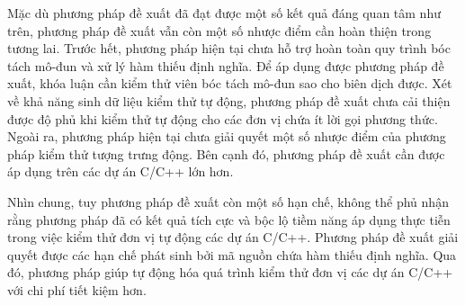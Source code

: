 Mặc dù phương pháp đề xuất đã đạt được một số kết quả đáng quan tâm như trên, phương pháp đề xuất vẫn còn một số nhược điểm cần hoàn thiện trong tương lai. Trước hết, phương pháp hiện tại chưa hỗ trợ hoàn toàn quy trình bóc tách mô-đun và xử lý hàm thiếu định nghĩa. Để áp dụng được phương pháp đề xuất, khóa luận cần kiểm thử viên bóc tách mô-đun sao cho biên dịch được. Xét về khả năng sinh dữ liệu kiểm thử tự động, phương pháp đề xuất chưa cải thiện được độ phủ khi kiểm thử tự động cho các đơn vị chứa ít lời gọi phương thức. Ngoài ra, phương pháp hiện tại chưa giải quyết một số nhược điểm của phương pháp kiểm thử tượng trưng động. Bên cạnh đó, phương pháp đề xuất cần được áp dụng trên các dự án C/C++ lớn hơn.

Nhìn chung, tuy phương pháp đề xuất còn một số hạn chế, không thể phủ nhận rằng phương pháp đã có kết quả tích cực và bộc lộ tiềm năng áp dụng thực tiễn trong việc kiểm thử đơn vị tự động các dự án C/C++. Phương pháp đề xuất giải quyết được các hạn chế phát sinh bởi mã nguồn chứa hàm thiếu định nghĩa. Qua đó, phương pháp giúp tự động hóa quá trình kiểm thử đơn vị các dự án C/C++ với chi phí tiết kiệm hơn.